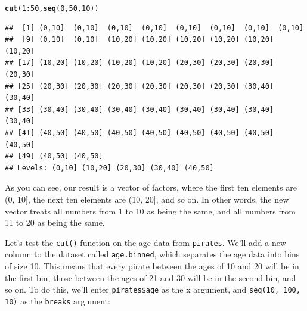\documentclass{tufte-book}\usepackage[]{graphicx}\usepackage[]{color}
\makeatletter
\newcommand{\hlnum}[1]{\textcolor[rgb]{0.686,0.059,0.569}{#1}}%
\newcommand{\hlcom}[1]{\textcolor[rgb]{0.678,0.584,0.686}{\textit{#1}}}%
\newcommand{\hlopt}[1]{\textcolor[rgb]{0,0,0}{#1}}%
\newcommand{\hlstd}[1]{\textcolor[rgb]{0.345,0.345,0.345}{#1}}%
\newcommand{\hlkwb}[1]{\textcolor[rgb]{0.69,0.353,0.396}{#1}}%
\newcommand{\hlkwc}[1]{\textcolor[rgb]{0.333,0.667,0.333}{#1}}%
\newcommand{\hlkwd}[1]{\textcolor[rgb]{0.737,0.353,0.396}{\textbf{#1}}}%
\newenvironment{kframe}{%
 \def\at@end@of@kframe{}%
 \ifinner\ifhmode%
  \def\at@end@of@kframe{\end{minipage}}%
  \begin{minipage}{\columnwidth}%
 \fi\fi%
 \def\FrameCommand##1{\hskip\@totalleftmargin \hskip-\fboxsep
 \colorbox{shadecolor}{##1}\hskip-\fboxsep
     \hskip-\linewidth \hskip-\@totalleftmargin \hskip\columnwidth}%
 \MakeFramed {\advance\hsize-\width
   \@totalleftmargin\z@ \linewidth\hsize
   \@setminipage}}%
 {\par\unskip\endMakeFramed%
 \at@end@of@kframe}
\newenvironment{knitrout}{}{} %
\makeatother
\begin{document}
\begin{footnotesize}
\begin{footnotesize}
\begin{knitrout}
\color{fgcolor}\begin{kframe}
\begin{alltt}
\hlkwd{cut}\hlstd{(}\hlnum{1}\hlopt{:}\hlnum{50}\hlstd{,} \hlkwd{seq}\hlstd{(}\hlnum{0}\hlstd{,} \hlnum{50}\hlstd{,} \hlnum{10}\hlstd{))}
\end{alltt}
\begin{verbatim}
##  [1] (0,10]  (0,10]  (0,10]  (0,10]  (0,10]  (0,10]  (0,10]  (0,10] 
##  [9] (0,10]  (0,10]  (10,20] (10,20] (10,20] (10,20] (10,20] (10,20]
## [17] (10,20] (10,20] (10,20] (10,20] (20,30] (20,30] (20,30] (20,30]
## [25] (20,30] (20,30] (20,30] (20,30] (20,30] (20,30] (30,40] (30,40]
## [33] (30,40] (30,40] (30,40] (30,40] (30,40] (30,40] (30,40] (30,40]
## [41] (40,50] (40,50] (40,50] (40,50] (40,50] (40,50] (40,50] (40,50]
## [49] (40,50] (40,50]
## Levels: (0,10] (10,20] (20,30] (30,40] (40,50]
\end{verbatim}
\end{kframe}
\end{knitrout}
\end{footnotesize}

As you can see, our result is a vector of factors, where the first ten elements are (0, 10], the next ten elements are (10, 20], and so on. In other words, the new vector treats all numbers from 1 to 10 as being the same, and all numbers from 11 to 20 as being the same.

Let's test the \texttt{cut()} function on the age data from \texttt{pirates}. We'll add a new column to the dataset called \texttt{age.binned}, which separates the age data into bins of size 10. This means that every pirate between the ages of 10 and 20 will be in the first bin, those between the ages of 21 and 30 will be in the second bin, and so on. To do this, we'll enter \texttt{pirates\$age} as the x argument, and \texttt{seq(10, 100, 10)} as the \texttt{breaks} argument:



\end{footnotesize}
\end{document}
